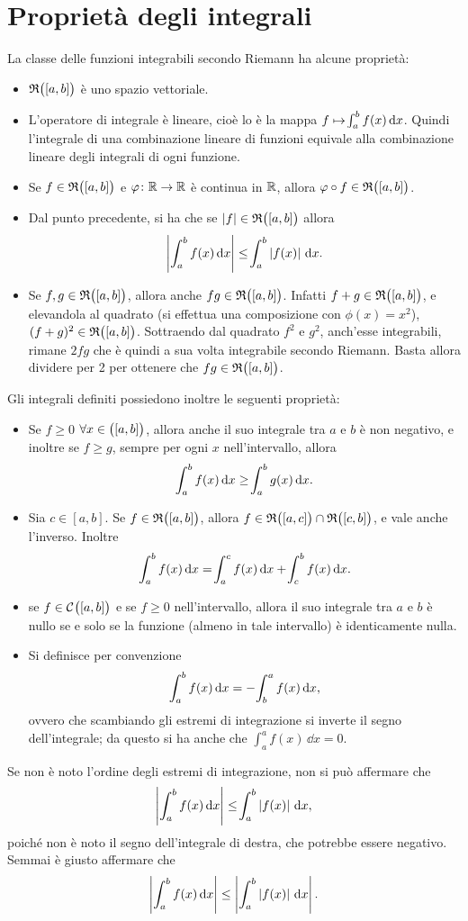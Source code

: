 \section{Proprietà degli integrali}
La classe delle funzioni integrabili secondo Riemann ha alcune proprietà:
\begin{itemize}
\item $\mathfrak{R}\big([a,b]\big)$ è uno spazio vettoriale.
\item L'operatore di integrale è lineare, cioè lo è la mappa $f\mapsto\!\int_a^bf(x)\,\textup{d} x$. Quindi l'integrale di una combinazione lineare di funzioni equivale alla combinazione lineare degli integrali di ogni funzione.
\item Se $f\in\mathfrak{R}\big([a,b]\big)$ e $\varphi\colon\mathbb{R}\to\mathbb{R}$ è continua in $\mathbb{R}$, allora $\varphi\circ f\in\mathfrak{R}\big([a,b]\big)$.
\item Dal punto precedente, si ha che se $\left|{f}\right|\in\mathfrak{R}\big([a,b]\big)$ allora
\[
\left|{\int_a^bf(x)\,\textup{d} x}\right|\leq\!\int_a^b\left|{f(x)}\right|\,\textup{d} x.
\]
\item Se $f,g\in\mathfrak{R}\big([a,b]\big)$, allora anche $fg\in\mathfrak{R}\big([a,b]\big)$. Infatti $f+g\in\mathfrak{R}\big([a,b]\big)$, e elevandola al quadrato (si effettua una composizione con $\phi(x)=x^2$), $(f+g)^2\in\mathfrak{R}\big([a,b]\big)$. Sottraendo dal quadrato $f^2$ e $g^2$, anch'esse integrabili, rimane $2fg$ che è quindi a sua volta integrabile secondo Riemann. Basta allora dividere per 2 per ottenere che $fg\in\mathfrak{R}\big([a,b]\big)$.
\end{itemize}
Gli integrali definiti possiedono inoltre le seguenti proprietà:
\begin{itemize}
\item Se $f\geq0$ $\forall x\in\big([a,b]\big)$, allora anche il suo integrale tra $a$ e $b$ è non negativo, e inoltre se $f\geq g$, sempre per ogni $x$ nell'intervallo, allora
\[
\int_a^bf(x)\,\textup{d} x\geq\!\int_a^bg(x)\,\textup{d} x.
\]
\item Sia $c\in[a,b]$. Se $f\in\mathfrak{R}\big([a,b]\big)$, allora $f\in\mathfrak{R}\big([a,c]\big)\cap\mathfrak{R}\big([c,b]\big)$, e vale anche l'inverso. Inoltre
\[
\int_a^bf(x)\,\textup{d} x=\!\int_a^cf(x)\,\textup{d} x+\!\int_c^bf(x)\,\textup{d} x.
\]
\item se $f\in\mathcal{C}^{{}}\big([a,b]\big)$ e se $f\geq 0$ nell'intervallo, allora il suo integrale tra $a$ e $b$ è nullo se e solo se la funzione (almeno in tale intervallo) è identicamente nulla.
\item Si definisce per convenzione
\[
\int_a^bf(x)\,\textup{d} x=-\!\int_b^af(x)\,\textup{d} x,
\]
ovvero che scambiando gli estremi di integrazione si inverte il segno dell'integrale; da questo si ha anche che $\int_a^af(x)\,\dd x=0$.
\end{itemize}
Se non è noto l'ordine degli estremi di integrazione, non si può affermare che
\[
\left|{\int_a^bf(x)\,\textup{d} x}\right|\leq\!\int_a^b\left|{f(x)}\right|\,\textup{d} x,
\]
poiché non è noto il segno dell'integrale di destra, che potrebbe essere negativo. Semmai è giusto affermare che
\[
\left|{\int_a^bf(x)\,\textup{d} x}\right|\leq\left|{\int_a^b\left|{f(x)}\right|\,\textup{d} x}\right|.
\]

